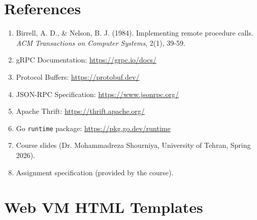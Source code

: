 \documentclass[a4paper]{article}
\begin{document}
\section{References}
\begin{enumerate}
    \item Birrell, A. D., \& Nelson, B. J. (1984). Implementing remote procedure calls. \textit{ACM Transactions on Computer Systems}, 2(1), 39-59.
    \item gRPC Documentation: \url{https://grpc.io/docs/}
    \item Protocol Buffers: \url{https://protobuf.dev/}
    \item JSON-RPC Specification: \url{https://www.jsonrpc.org/}
    \item Apache Thrift: \url{https://thrift.apache.org/}
    \item Go \texttt{runtime} package: \url{https://pkg.go.dev/runtime}
    \item Course slides (Dr. Mohammadreza Shourniya, University of Tehran, Spring 2026).
    \item Assignment specification (provided by the course).
\end{enumerate}





\newpage
\appendix
\section{Web VM HTML Templates}
\end{document}
